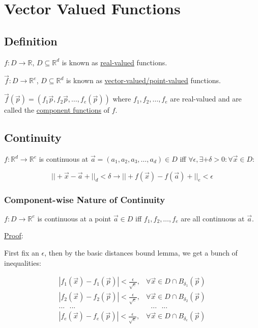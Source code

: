 \documentclass[11 pt, twoside]{article}
\begin{document}
\section{Vector Valued Functions}

\subsection{Definition}

$f: D \to \mathbb{R}$, $D \subseteq \mathbb{R}^d$ is known as
\underline{real-valued} functions.

$\vec{f}: D \to \mathbb{R}^e$, $D \subseteq \mathbb{R}^d$ is known as
\underline{vector-valued/point-valued} functions.

$\vec{f}(\vec{p}) = (f_1{\vec{p}}, f_2{\vec{p}}, \dots, f_e(\vec{p}))$ where
$f_1, f_2, \dots, f_e$ are real-valued and are called the \underline{component
functions} of $f$.

\subsection{Continuity}
$f: \mathbb{R}^d \to \mathbb{R}^e$ is continuous at $\vec{a} = (a_1, a_2,
a_3, \dots, a_d) \in D$ iff $\forall \epsilon, \exists+\delta > 0 : \forall \vec{x} \in D$:

$$||+\vec{x} - \vec{a}+||_d < \delta \to ||+f(\vec{x}) - f(\vec{a})+||_e <
\epsilon$$

\subsubsection{Component-wise Nature of Continuity}
$f: D \to \mathbb{R}^e$ is continuous at a point $\vec{a} \in D$ iff $f_1,
f_2, \dots, f_e$ are all continuous at $\vec{a}$.

\underline{Proof}:

First fix an $\epsilon$, then by the basic distances bound lemma, we get a
bunch of inequalities:

\begin{align*}
|f_1(\vec{x}) - f_1(\vec{p})| < \frac{\epsilon}{\sqrt{e}}, &\forall \vec{x} \in D \cap B_{\delta_1}(\vec{p})\\
|f_2(\vec{x}) - f_2(\vec{p})| < \frac{\epsilon}{\sqrt{e}}, &\forall \vec{x} \in D \cap B_{\delta_2}(\vec{p})\\
... \text{ } ... \text{ } & \text{ } ... \text{ }...\\
|f_e(\vec{x}) - f_e(\vec{p})| < \frac{\epsilon}{\sqrt{e}}, &\forall
\vec{x} \in D \cap B_{\delta_e}(\vec{p})
\end{align*}
\end{document}
